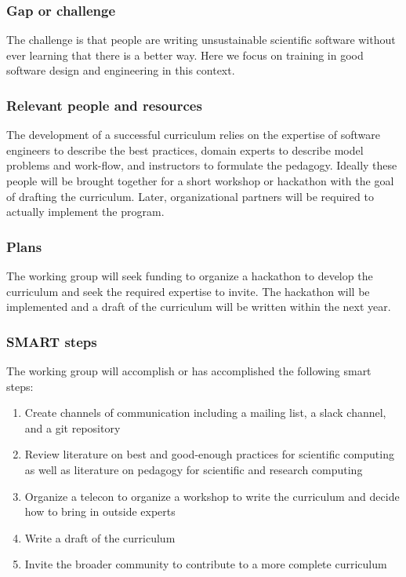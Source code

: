 \subsubsection{Gap or challenge}

The challenge is that people are writing unsustainable scientific
software without ever learning that there is a better way. Here we
focus on training in good software design and engineering in this
context.

\subsubsection{Relevant people and resources}

The development of a successful curriculum relies on the expertise of
software engineers to describe the best practices, domain experts to
describe model problems and work-flow, and instructors to formulate
the pedagogy. Ideally these people will be brought together for a
short workshop or hackathon with the goal of drafting the
curriculum. Later, organizational partners will be required to
actually implement the program.

\subsubsection{Plans}

The working group will seek funding to organize a hackathon to develop
the curriculum and seek the required expertise to invite. The
hackathon will be implemented and a draft of the curriculum will be
written within the next year.

\subsubsection{SMART steps}

The working group will accomplish or has accomplished the following
smart steps:

\begin{enumerate}
\item Create channels of communication including a mailing list, a
  slack channel, and a git repository
\item Review literature on best and good-enough practices for
  scientific computing as well as literature on pedagogy for
  scientific and research computing
\item Organize a telecon to organize a workshop to write the
  curriculum and decide how to bring in outside experts
\item Write a draft of the curriculum
\item Invite the broader community to contribute to a more complete
  curriculum
\end{enumerate}

